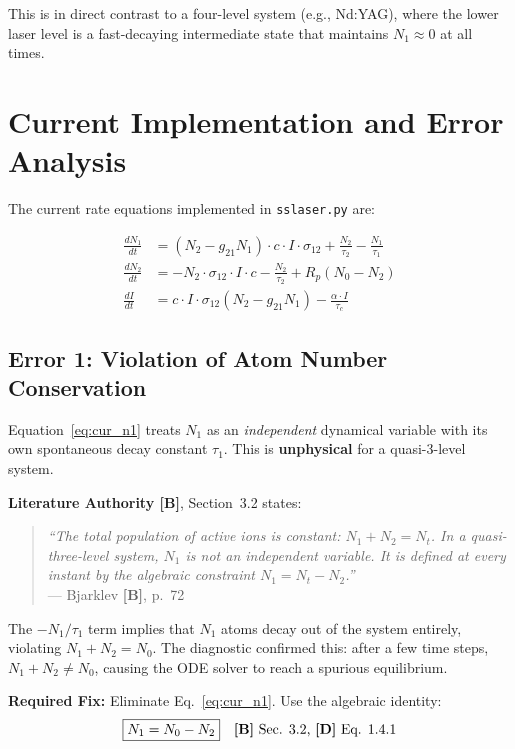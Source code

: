 \documentclass[12pt,a4paper]{article}
\begin{document}
This is in direct contrast to a four-level system (e.g., Nd:YAG), where the lower laser level is a fast-decaying intermediate state that maintains $N_1 \approx 0$ at all times.

\section{Current Implementation and Error Analysis}

The current rate equations implemented in \texttt{sslaser.py} are:

\begin{align}
\frac{dN_1}{dt} &= (N_2 - g_{21} N_1) \cdot c \cdot I \cdot \sigma_{12} + \frac{N_2}{\tau_2} - \frac{N_1}{\tau_1} \label{eq:cur_n1} \\
\frac{dN_2}{dt} &= -N_2 \cdot \sigma_{12} \cdot I \cdot c - \frac{N_2}{\tau_2} + R_p(N_0 - N_2) \label{eq:cur_n2} \\
\frac{dI}{dt} &= c \cdot I \cdot \sigma_{12}(N_2 - g_{21} N_1) - \frac{\alpha \cdot I}{\tau_c} \label{eq:cur_I}
\end{align}

\subsection{Error 1: Violation of Atom Number Conservation}

Equation~\ref{eq:cur_n1} treats $N_1$ as an \textit{independent} dynamical variable with its own spontaneous decay constant $\tau_1$. This is \textbf{unphysical} for a quasi-3-level system.

\textbf{Literature Authority [B]}, Section~3.2 states:
\begin{quote}
\textit{``The total population of active ions is constant: $N_1 + N_2 = N_t$. In a quasi-three-level system, $N_1$ is not an independent variable. It is defined at every instant by the algebraic constraint $N_1 = N_t - N_2$.''} \\
--- Bjarklev \textbf{[B]}, p.~72
\end{quote}

The $-N_1/\tau_1$ term implies that $N_1$ atoms decay out of the system entirely, violating $N_1 + N_2 = N_0$. The diagnostic confirmed this: after a few time steps, $N_1 + N_2 \neq N_0$, causing the ODE solver to reach a spurious equilibrium.

\textbf{Required Fix:} Eliminate Eq.~\ref{eq:cur_n1}. Use the algebraic identity:
\begin{equation}
\boxed{N_1 = N_0 - N_2} \quad \text{\textbf{[B]} Sec. 3.2, \textbf{[D]} Eq. 1.4.1}
\end{equation}
\end{document}
